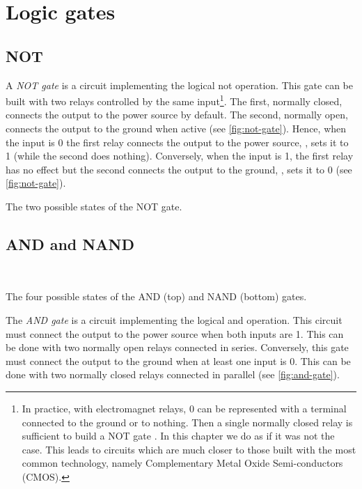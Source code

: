 \section{Logic gates}

\subsection{NOT}

A {\em NOT gate} is a circuit implementing the logical not operation. This gate
can be built with two relays controlled by the same input\footnote{In practice,
with electromagnet relays, 0 can be represented with a terminal connected to
the ground or to nothing. Then a single normally closed relay is sufficient to
build a NOT gate \cite{MerciaRelay}. In this chapter we do as if it was not the
case. This leads to circuits which are much closer to those built with the most
common technology, namely Complementary Metal Oxide Semi-conductors (CMOS).}.
The first, normally closed, connects the output to the power source by default.
The second, normally open, connects the output to the ground when active (see
\cref{fig:not-gate}). Hence, when the input is 0 the first relay connects the
output to the power source, \ie, sets it to 1 (while the second does nothing).
Conversely, when the input is 1, the first relay has no effect but the second
connects the output to the ground, \ie, sets it to 0 (see \cref{fig:not-gate}).

\begin{Figure}
  

  \caption{The two possible states of the NOT gate.}\label{fig:not-gate}
\end{Figure}

\subsection{AND and NAND}

\begin{Figure}
   \\
  \medskip
  

  \caption{The four possible states of the AND (top) and NAND (bottom)
    gates.}\label{fig:and-gate}
\end{Figure}

The {\em AND gate} is a circuit implementing the logical and operation. This
circuit must connect the output to the power source when both inputs are 1.
This can be done with two normally open relays connected in series. Conversely,
this gate must connect the output to the ground when at least one input is 0.
This can be done with two normally closed relays connected in parallel (see
\cref{fig:and-gate}).

